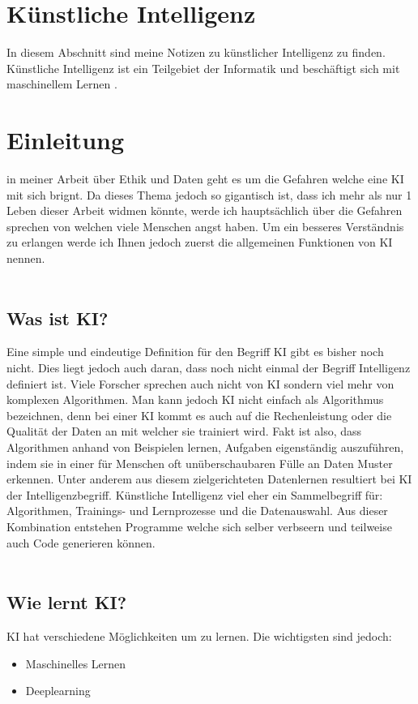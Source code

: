 \section{Künstliche Intelligenz}
\label{sec:ai}

In diesem Abschnitt sind meine Notizen zu künstlicher Intelligenz zu finden.
Künstliche Intelligenz ist ein Teilgebiet der Informatik und beschäftigt sich mit maschinellem Lernen \citep{ai-wikipedia}.

\section{Einleitung}
in meiner Arbeit über Ethik und Daten geht es um die Gefahren welche eine KI mit sich brignt. Da dieses Thema jedoch so gigantisch ist, dass ich mehr als nur 1 Leben dieser Arbeit widmen könnte, werde ich hauptsächlich über die Gefahren sprechen von welchen viele Menschen angst haben.
Um ein besseres Verständnis zu erlangen werde ich Ihnen jedoch zuerst die allgemeinen Funktionen von KI nennen.
\\
\\
\subsection{Was ist KI?}
Eine simple und eindeutige Definition für den Begriff KI gibt es bisher noch nicht. Dies liegt jedoch auch daran, dass noch nicht einmal der Begriff Intelligenz definiert ist.
Viele Forscher sprechen auch nicht von KI sondern viel mehr von komplexen Algorithmen. Man kann jedoch KI nicht einfach als Algorithmus bezeichnen, denn bei einer KI kommt es auch auf die Rechenleistung oder die Qualität der Daten an mit welcher sie trainiert wird. 
Fakt ist also, dass Algorithmen anhand von Beispielen lernen, Aufgaben eigenständig auszuführen, indem sie in einer für Menschen oft unüberschaubaren Fülle an Daten Muster erkennen. Unter anderem aus diesem zielgerichteten Datenlernen resultiert bei KI der Intelligenzbegriff.
Künstliche Intelligenz viel eher ein Sammelbegriff für: Algorithmen, Trainings- und Lernprozesse und die Datenauswahl. Aus dieser Kombination entstehen Programme welche sich selber verbseern und teilweise auch Code generieren können.
\\
\\
\subsection{Wie lernt KI?}
KI hat verschiedene Möglichkeiten um zu lernen. Die wichtigsten sind jedoch:
\begin{itemize}
    \item Maschinelles Lernen
    \item Deeplearning
\end{itemize}

